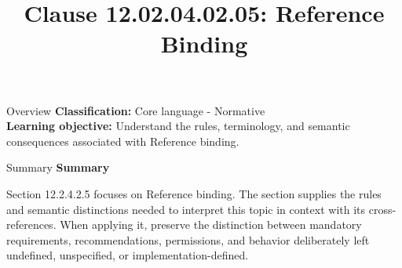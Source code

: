 \documentclass[10pt,letterpaper]{article}
\title{Clause 12.02.04.02.05: Reference Binding}
\author{}
\date{}
\begin{document}
\maketitle
\begin{CornellOverviewBox}{Overview}
\textbf{Classification:} Core language - Normative\\[2pt]
\textbf{Learning objective:} Understand the rules, terminology, and semantic consequences associated with Reference binding.
\end{CornellOverviewBox}\begin{CornellSummaryBox}{Summary}
{\sffamily\bfseries\color{Accent} Summary}\par\vspace{3pt}Section 12.2.4.2.5 focuses on Reference binding. The section supplies the rules and semantic distinctions needed to interpret this topic in context with its cross-references. When applying it, preserve the distinction between mandatory requirements, recommendations, permissions, and behavior deliberately left undefined, unspecified, or implementation-defined.
\end{CornellSummaryBox}
\end{document}
